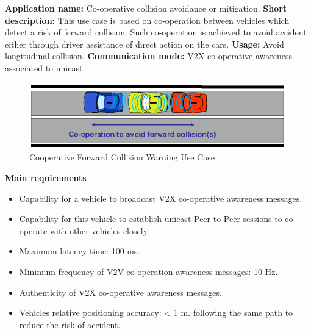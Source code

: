 \textbf{Application name:} Co-operative collision avoidance or mitigation.
\textbf{Short description:} This use case is based on co-operation between vehicles which detect a risk of forward collision.
Such co-operation is achieved to avoid accident either through driver assistance of direct action on the cars.
\textbf{Usage:} Avoid longitudinal collision.
\textbf{Communication mode:} V2X co-operative awareness associated to unicast.
\begin{figure}[htbp]
\includegraphics[width=0.99\textwidth]{content/images/06_use_cases/colissionwarning.png}
\caption{Cooperative Forward Collision Warning Use Case}
\label{fig:cfcw}
\end{figure}
\textbf{Main requirements}
\begin{itemize}
\item Capability for a vehicle to broadcast V2X co-operative awareness messages.
\item Capability for this vehicle to establish unicast Peer to Peer sessions to co-operate with other vehicles closely
\item Maximum latency time: 100 ms.
\item Minimum frequency of V2V co-operation awareness messages: 10 Hz.
\item Authenticity of V2X co-operative awareness messages.
\item Vehicles relative positioning accuracy: < 1 m.
following the same path to reduce the risk of accident.
\end{itemize}

